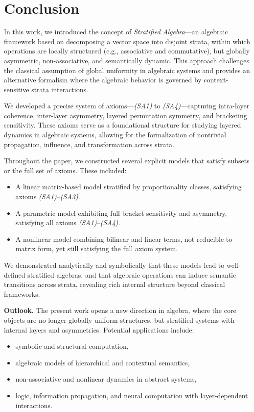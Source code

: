 \documentclass[12pt]{article}
\theoremstyle{definition}
\theoremstyle{plain}
\theoremstyle{remark}
\begin{document}
\section*{Conclusion}

In this work, we introduced the concept of \emph{Stratified Algebra}—an algebraic framework based on decomposing a vector space into disjoint strata, within which operations are locally structured (e.g., associative and commutative), but globally asymmetric, non-associative, and semantically dynamic. This approach challenges the classical assumption of global uniformity in algebraic systems and provides an alternative formalism where the algebraic behavior is governed by context-sensitive strata interactions.

We developed a precise system of axioms—\emph{(SA1)} to \emph{(SA4)}—capturing intra-layer coherence, inter-layer asymmetry, layered permutation symmetry, and bracketing sensitivity. These axioms serve as a foundational structure for studying layered dynamics in algebraic systems, allowing for the formalization of nontrivial propagation, influence, and transformation across strata.

Throughout the paper, we constructed several explicit models that satisfy subsets or the full set of axioms. These included:
\begin{itemize}
    \item A linear matrix-based model stratified by proportionality classes, satisfying axioms \emph{(SA1)}–\emph{(SA3)}.
    \item A parametric model exhibiting full bracket sensitivity and asymmetry, satisfying all axioms \emph{(SA1)}–\emph{(SA4)}.
    \item A nonlinear model combining bilinear and linear terms, not reducible to matrix form, yet still satisfying the full axiom system.
\end{itemize}

We demonstrated analytically and symbolically that these models lead to well-defined stratified algebras, and that algebraic operations can induce semantic transitions across strata, revealing rich internal structure beyond classical frameworks.

\medskip

\noindent\textbf{Outlook.}
The present work opens a new direction in algebra, where the core objects are no longer globally uniform structures, but stratified systems with internal layers and asymmetries. Potential applications include:
\begin{itemize}
    \item symbolic and structural computation,
    \item algebraic models of hierarchical and contextual semantics,
    \item non-associative and nonlinear dynamics in abstract systems,
    \item logic, information propagation, and neural computation with layer-dependent interactions.
\end{itemize}
\end{document}
